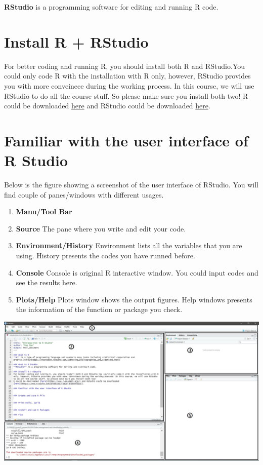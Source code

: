 \documentclass[]{book}
\providecommand{\tightlist}{%
  \setlength{\itemsep}{0pt}\setlength{\parskip}{0pt}}
\begin{document}
\textbf{RStudio} is a programming software for editing and running R code.

\hypertarget{install-r-rstudio}{%
\section{Install R + RStudio}\label{install-r-rstudio}}

For better coding and running R, you should install both R and RStudio.You could only code R with the installation with R only, however, RStudio provides you with more conveinece during the working process. In this course, we will use RStudio to do all the course stuff. So please make sure you install both two!
R could be downloaded \href{https://www.r-project.org/}{here} and RStudio could be downloaded \href{https://www.rstudio.com/products/rstudio/download/}{here}.

\hypertarget{familiar-with-the-user-interface-of-r-studio}{%
\section{Familiar with the user interface of R Studio}\label{familiar-with-the-user-interface-of-r-studio}}

Below is the figure showing a screenshot of the user interface of RStudio. You will find couple of panes/windows with different usages.

\begin{enumerate}
\def\labelenumi{\arabic{enumi}.}
\tightlist
\item
  \textbf{Manu/Tool Bar}
\item
  \textbf{Source} The pane where you write and edit your code.
\item
  \textbf{Environment/History} Environment lists all the variables that you are using. History presents the codes you have runned before.
\item
  \textbf{Console} Console is original R interactive window. You could input codes and see the results here.
\item
  \textbf{Plots/Help} Plots window shows the output figures. Help windows presents the information of the function or package you check.
\end{enumerate}

\includegraphics{Pics/RStudio.JPG}
\end{document}
